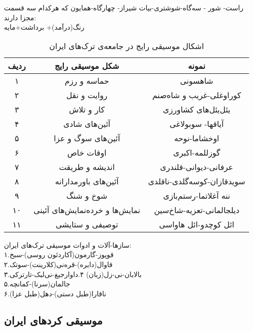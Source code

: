         راست- شور - سه‌گاه-شوشتری-بیات شیراز- چهارگاه-همایون
        که هرکدام سه قسمت مجزا دارند:\\
        
        رنگ(درآمد)+ برداشت+مایه
        
        \begin{table}[!h]
\centering
\begin{tabular}{|c|c|c|}
	\hline
    ردیف &  شکل موسیقی رایج &  نمونه\\
	\hline\hline
    ۱ & حماسه و رزم & شاهسونی \\
	\hline
    ۲ & روایت و نقل& کوراوغلی-غریب و شاه‌صنم \\
	\hline
	۳ & کار و تلاش & یئل‌یئل‌های کشاورزی
\\	\hline
	۴ &آئین‌های شادی  & آیاقها- سوبولاغی \\
	\hline
	۵ & آئین‌های سوگ و عزا & اوخشاما-نوحه \\
	\hline
	۶ & اوقات خاص & گوزللمه-اکبری \\
	\hline
	۷ & اندیشه و طریقت & عرفانی-دیوانی-قلندری  \\
	\hline
	۸ & آئین‌های باورمدارانه & سویدقازان-کوسه‌گلدی-ناقلدی\\
	\hline
	۹ &  شوخ و شنگ & ننه آغلاتما-رستم‌بازی\\
	\hline
	۱۰ & نمایش‌ها و خرده‌نمایش‌های آئینی & دیلجالمانی-تعزیه-شاخ‌سین  \\
	\hline
	۱۱ & توصیفی و ستایشی  & ائل کوچدو-ائل هاواسی  \\
	\hline
\end{tabular}
\caption{اشکال موسیقی رایج در جامعه‌ی ترک‌های ایران}
\label{t1}
\end{table}
سازها-آلات و ادوات موسیقی ترک‌های ایران:\\
۱.قوپوز-گارمون(آکاردئون روسی)-سبخ\\
۲.قاوال(دایره)-قره‌نی(کلارینت)-سوتک\\
۳.بالابان-نی-زل(زبان)
۴.داوارجیغ-نی‌لبک-تارترکی\\
۵.جالمان(سرنا)-کمانچه\\
۶.ناقارا(طبل دستی)-دهل(طبل عزا)
\subsection{موسیقی کردهای ایران}
